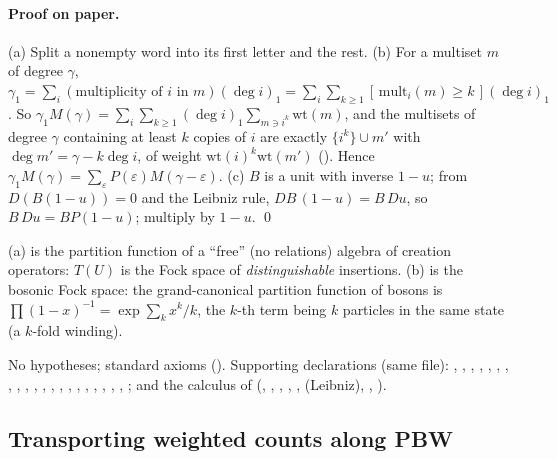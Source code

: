 \paragraph{Proof on paper.}  (a) Split a nonempty word into its first letter and the rest.  (b) For a multiset $m$ of degree
$\gamma$, $\gamma_1=\sum_{i}(\text{multiplicity of }i\text{ in }m)(\deg i)_1=\sum_i\sum_{k\ge1}[\,\mathrm{mult}_i(m)\ge k\,](\deg i)_1$.  So
$\gamma_1M(\gamma)=\sum_i\sum_{k\ge1}(\deg i)_1\sum_{m\ni i^k}\mathrm{wt}(m)$, and the multisets of degree $\gamma$ containing at least $k$
copies of $i$ are exactly $\{i^k\}\cup m'$ with $\deg m'=\gamma-k\deg i$, of weight $\mathrm{wt}(i)^k\mathrm{wt}(m')$
().  Hence $\gamma_1M(\gamma)=\sum_\varepsilon P(\varepsilon)M(\gamma-\varepsilon)$.  (c) $B$ is a unit with
inverse $1-u$; from $D(B(1-u))=0$ and the Leibniz rule, $DB\,(1-u)=B\,Du$, so $B\,Du=BP(1-u)$; multiply by $1-u$. \qed
\begin{physics}
(a) is the partition function of a ``free'' (no relations) algebra of creation operators: $T(U)$ is the Fock space of
\emph{distinguishable} insertions.  (b) is the bosonic Fock space: the grand-canonical partition function of bosons
is $\prod(1-x)^{-1}=\exp\sum_k x^k/k$, the $k$-th term being $k$ particles in the same state (a $k$-fold winding).
\end{physics}
\begin{status}No hypotheses; standard axioms ().  Supporting declarations (same file):
, , , , ,
, , , ,
, , ,
, , , , , ,
, , , ; and the
 calculus of  (, ,
, , ,  (Leibniz), , ).\end{status}

\subsection{Transporting weighted counts along PBW}

